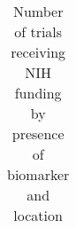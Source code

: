 
\begin{table}[htbp]\centering
\caption{Number of trials receiving NIH funding by presence of biomarker and location}
\begin{tabular}{l*{4}{c}}
\hline\hline



\hline\hline
\end{tabular}
\end{table}
